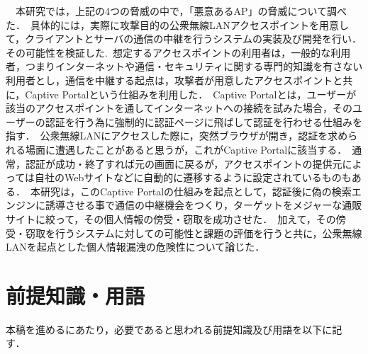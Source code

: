 \documentclass[dvipdfmx]{jsarticle}
\begin{document}
        　本研究では，上記の4つの脅威の中で，「悪意あるAP」の脅威について調べた．\
        具体的には，実際に攻撃目的の公衆無線LANアクセスポイントを用意して，クライアントとサーバの通信の中継を行うシステムの実装及び開発を行い．その可能性を検証した.\
        想定するアクセスポイントの利用者は，一般的な利用者，つまりインターネットや通信・セキュリティに関する専門的知識を有さない利用者とし，通信を中継する起点は，攻撃者が用意したアクセスポイントと共に，Captive Portalという仕組みを利用した．\
        Captive Portalとは，ユーザーが該当のアクセスポイントを通してインターネットへの接続を試みた場合，そのユーザーの認証を行う為に強制的に認証ページに飛ばして認証を行わせる仕組みを指す．\
        公衆無線LANにアクセスした際に，突然ブラウザが開き，認証を求められる場面に遭遇したことがあると思うが，これがCaptive Portalに該当する．\
        通常，認証が成功・終了すれば元の画面に戻るが，アクセスポイントの提供元によっては自社のWebサイトなどに自動的に遷移するように設定されているものもある．\
        本研究は，このCaptive Portalの仕組みを起点として，認証後に偽の検索エンジンに誘導させる事で通信の中継機会をつくり，ターゲットをメジャーな通販サイトに絞って，その個人情報の傍受・窃取を成功させた．\
        加えて，その傍受・窃取を行うシステムに対しての可能性と課題の評価を行うと共に，公衆無線LANを起点とした個人情報漏洩の危険性について論じた．\
    \section{前提知識・用語}
        本稿を進めるにあたり，必要であると思われる前提知識及び用語を以下に記す．\
\end{document}
